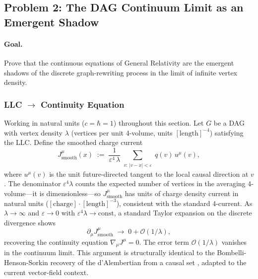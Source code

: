 \documentclass[11pt,a4paper]{article}
\theoremstyle{plain}
\theoremstyle{definition}
\theoremstyle{remark}
\begin{document}
\subsection{Problem 2: The DAG Continuum Limit as an Emergent Shadow}
\label{sec:continuum}

\paragraph{Goal.} Prove that the continuous equations of General Relativity are
the emergent shadows of the discrete graph-rewriting process in the limit of
infinite vertex density.

\subsubsection{LLC \texorpdfstring{$\to$}{→} Continuity Equation}

Working in natural units ($c = \hbar = 1$) throughout this section.
Let $G$ be a DAG with vertex density $\lambda$ (vertices per unit 4-volume, units
$[\text{length}]^{-4}$) satisfying the LLC. Define the smoothed charge current
\begin{equation}
  J^{\mu}_{\mathrm{smooth}}(x)
  \;:=\;
  \frac{1}{\varepsilon^{4}\,\lambda}
  \sum_{\substack{v:\,|v-x|<\varepsilon}} q(v)\,u^{\mu}(v),
\end{equation}
where $u^{\mu}(v)$ is the unit future-directed tangent to the local causal
direction at $v$. The denominator $\varepsilon^{4}\lambda$ counts the expected
number of vertices in the averaging 4-volume---it is dimensionless---so
$J^{\mu}_{\mathrm{smooth}}$ has units of charge density current in natural units
($[\text{charge}]\cdot[\text{length}]^{-3}$), consistent with the standard
4-current. As $\lambda \to \infty$ and $\varepsilon \to 0$ with
$\varepsilon^{4}\lambda \to \mathrm{const}$, a standard Taylor expansion on the
discrete divergence shows
\begin{equation}
  \partial_{\mu}J^{\mu}_{\mathrm{smooth}} \;\to\; 0 + \mathcal{O}(1/\lambda),
\end{equation}
recovering the continuity equation $\nabla_{\mu}J^{\mu} = 0$. The error term
$\mathcal{O}(1/\lambda)$ vanishes in the continuum limit. This argument is
structurally identical to the Bombelli-Henson-Sorkin recovery of the d'Alembertian
from a causal set \citep{Bombelli2009}, adapted to the current vector-field context.
\end{document}
